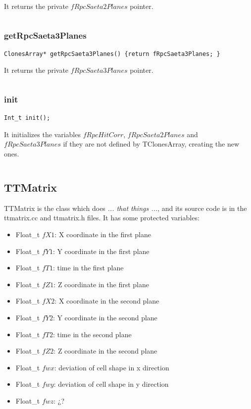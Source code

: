 \documentclass[a4paper]{book}
\begin{document}
It returns the private $fRpcSaeta2Planes$ pointer.

\[\]

\subsubsection{getRpcSaeta3Planes}

\begin{lstlisting}
ClonesArray* getRpcSaeta3Planes() {return fRpcSaeta3Planes; }
\end{lstlisting}

It returns the private $fRpcSaeta3Planes$ pointer.

\[\]

\subsubsection{init}

\begin{lstlisting}
Int_t init();
\end{lstlisting}

It initializes the variables $fRpcHitCorr$, $fRpcSaeta2Planes$ and $fRpcSaeta3Planes$ if they are not defined by TClonesArray, creating the new ones.

\[\]

\subsection{TTMatrix}

TTMatrix is the class which does \textit{... that things ...}, and its source code is in the ttmatrix.cc and ttmatrix.h files. It has some protected variables:

\begin{itemize}
	\item Float\_t $fX1$: X coordinate in the first plane
	\item Float\_t $fY1$: Y coordinate in the first plane
	\item Float\_t $fT1$: time in the first plane
	\item Float\_t $fZ1$: Z coordinate in the first plane
	\item Float\_t $fX2$: X coordinate in the second plane
	\item Float\_t $fY2$: Y coordinate in the second plane
	\item Float\_t $fT2$: time in the second plane
	\item Float\_t $fZ2$: Z coordinate in the second plane
	\item Float\_t $fwx$: deviation of cell shape in x direction
	\item Float\_t $fwy$: deviation of cell shape in y direction
	\item Float\_t $fwz$: ¿?
\end{itemize}
\end{document}
